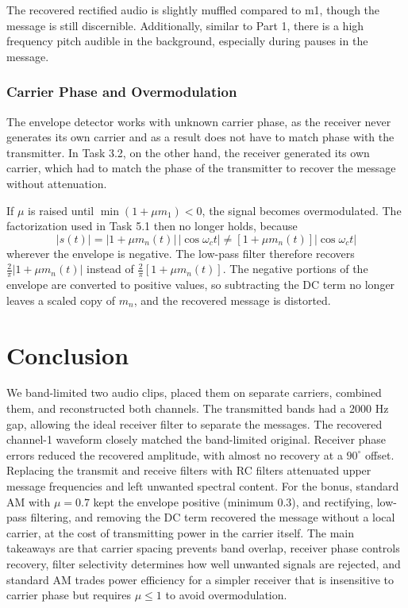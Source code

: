 \documentclass[11pt,a4paper]{article}
\begin{document}
The recovered rectified audio is slightly muffled compared to m1, though the message is still discernible. Additionally, similar to Part 1, there is a high frequency pitch audible in the background, especially during pauses in the message.

\subsubsection{Carrier Phase and Overmodulation}

The envelope detector works with unknown carrier phase, as the receiver never generates its own carrier and as a result does not have to match phase with the transmitter. In Task 3.2, on the other hand, the receiver generated its own carrier, which had to match the phase of the transmitter to recover the message without attenuation. 

If $\mu$ is raised until $\min(1 + \mu m_1) < 0$, the signal becomes overmodulated. The factorization used in Task 5.1 then no longer holds, because
\[
|s(t)| = \left|1 + \mu m_n(t)\right| \, |\cos\omega_c t| \neq \left[1 + \mu m_n(t)\right] |\cos\omega_c t|
\]
wherever the envelope is negative. The low-pass filter therefore recovers $\frac{2}{\pi}\left|1 + \mu m_n(t)\right|$ instead of $\frac{2}{\pi}\left[1 + \mu m_n(t)\right]$. The negative portions of the envelope are converted to positive values, so subtracting the DC term no longer leaves a scaled copy of $m_n$, and the recovered message is distorted.

\newpage
\section{Conclusion}

We band-limited two audio clips, placed them on separate carriers, combined them, and reconstructed both channels. The transmitted bands had a 2000 Hz gap, allowing the ideal receiver filter to separate the messages. The recovered channel-1 waveform closely matched the band-limited original. Receiver phase errors reduced the recovered amplitude, with almost no recovery at a $90^\circ$ offset. Replacing the transmit and receive filters with RC filters attenuated upper message frequencies and left unwanted spectral content. For the bonus, standard AM with $\mu = 0.7$ kept the envelope positive (minimum 0.3), and rectifying, low-pass filtering, and removing the DC term recovered the message without a local carrier, at the cost of transmitting power in the carrier itself. The main takeaways are that carrier spacing prevents band overlap, receiver phase controls recovery, filter selectivity determines how well unwanted signals are rejected, and standard AM trades power efficiency for a simpler receiver that is insensitive to carrier phase but requires $\mu \le 1$ to avoid overmodulation.
\end{document}
